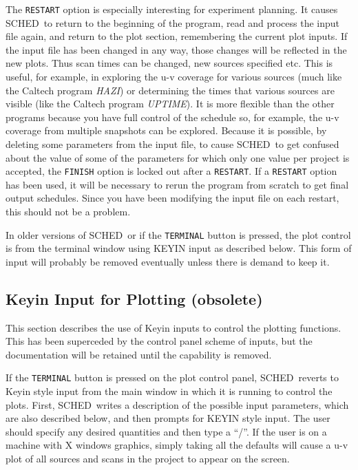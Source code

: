 \documentclass{report}
\newcommand{\schedb}{{\sc SCHED~}}
\begin{document}
The {\tt RESTART} option is especially interesting for experiment
planning.  It causes \schedb to return to the beginning of the
program, read and process the input file again, and return to the plot
section, remembering the current plot inputs.  If the input file has
been changed in any way, those changes will be reflected in the new
plots.  Thus scan times can be changed, new sources specified etc.
This is useful, for example, in exploring the u-v coverage for various
sources (much like the Caltech program {\sl HAZI}) or determining the
times that various sources are visible (like the Caltech program {\sl
UPTIME}).  It is more flexible than the other programs because you
have full control of the schedule so, for example, the u-v coverage
from multiple snapshots can be explored.  Because it is possible, by
deleting some parameters from the input file, to cause \schedb to get
confused about the value of some of the parameters for which only one
value per project is accepted, the {\tt FINISH} option is locked out
after a {\tt RESTART}.  If a {\tt RESTART} option has been used, it
will be necessary to rerun the program from scratch to get final
output schedules.  Since you have been modifying the input file on
each restart, this should not be a problem.

In older versions of \schedb or if the {\tt TERMINAL} button is pressed,
the plot control is from the terminal window using KEYIN input as
described below.  This form of input will probably be removed eventually
unless there is demand to keep it.

\subsection{Keyin Input for Plotting (obsolete)}

This section describes the use of Keyin inputs to control the plotting
functions.  This has been superceded by the control panel scheme
of inputs, but the documentation will be retained until the capability
is removed.

If the {\tt TERMINAL} button is pressed on the plot control panel,
\schedb reverts to Keyin style input from the main window in which it
is running to control the plots.  First, \schedb writes a description
of the possible input parameters, which are also described below, and
then prompts for KEYIN style input.  The user should specify any
desired quantities and then type a ``/''.  If the user is on a machine
with X windows graphics, simply taking all the defaults will cause a
u-v plot of all sources and scans in the project to appear on the
screen.
\end{document}
